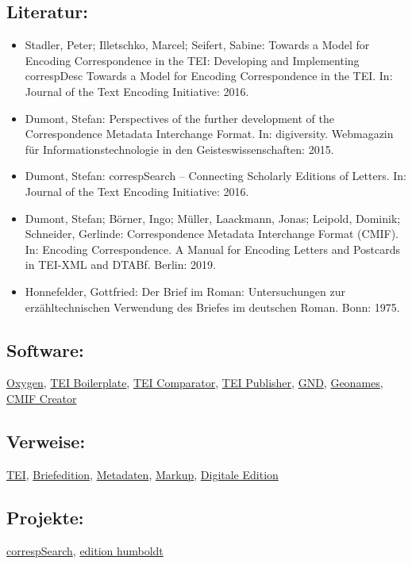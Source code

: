 \documentclass{article}
\begin{document}
        \subsection*{Literatur:}\begin{itemize}\item Stadler, Peter; Illetschko, Marcel; Seifert, Sabine: Towards a Model for Encoding Correspondence in the TEI:
                              Developing and Implementing correspDesc Towards a Model for Encoding Correspondence in the
                              TEI. In: Journal of the Text Encoding Initiative: 2016.\item Dumont, Stefan: Perspectives of the further development of the
                              Correspondence Metadata Interchange Format. In: digiversity. Webmagazin für Informationstechnologie in
                              den Geisteswissenschaften: 2015.\item Dumont, Stefan: correspSearch – Connecting Scholarly Editions of
                              Letters. In: Journal of the Text Encoding Initiative: 2016.\item Dumont, Stefan; Börner, Ingo; Müller, Laackmann, Jonas; Leipold, Dominik; Schneider, Gerlinde: Correspondence Metadata Interchange Format
                              (CMIF). In: Encoding Correspondence. A Manual for Encoding Letters
                              and Postcards in TEI-XML and DTABf. Berlin: 2019.\item Honnefelder, Gottfried: Der Brief im Roman: Untersuchungen zur erzähltechnischen
                              Verwendung des Briefes im deutschen Roman. Bonn: 1975.\end{itemize}\subsection*{Software:}\href{http://oxygenxml.com/}{Oxygen}, \href{http://dcl.ils.indiana.edu/teibp/index.html}{TEI Boilerplate}, \href{https://sourceforge.net/projects/tei-comparator/}{TEI
                           Comparator}, \href{https://teipublisher.com/index.html}{TEI
                           Publisher}, \href{http://www.dnb.de/DE/Standardisierung/GND/gnd_node.html}{GND}, \href{geonames.org}{Geonames}, \href{https://correspsearch.net/creator/index.xql?l=de}{CMIF
                           Creator}\subsection*{Verweise:}\href{https://gams.uni-graz.at/o:konde.178}{TEI}, \href{https://gams.uni-graz.at/o:konde.39}{Briefedition}, \href{https://gams.uni-graz.at/o:konde.25}{Metadaten}, \href{https://gams.uni-graz.at/o:konde.126}{Markup}, \href{https://gams.uni-graz.at/o:konde.59}{Digitale Edition}\subsection*{Projekte:}\href{https://correspsearch.net}{correspSearch}, \href{https://edition-humboldt.de}{edition humboldt
}
\end{document}
